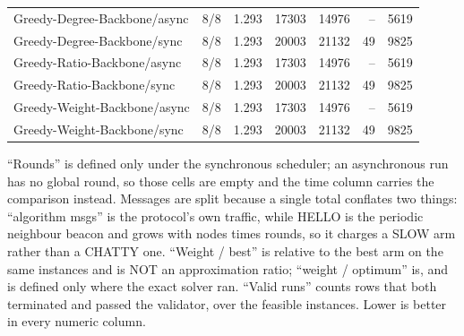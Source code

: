 \begin{table}[tb]
\begin{tabular}{lrrrrrr}
Greedy-Degree-Backbone/async & 8/8 & 1.293 & 17303 & 14976 & -- & 5619 \\
Greedy-Degree-Backbone/sync & 8/8 & 1.293 & 20003 & 21132 & 49 & 9825 \\
Greedy-Ratio-Backbone/async & 8/8 & 1.293 & 17303 & 14976 & -- & 5619 \\
Greedy-Ratio-Backbone/sync & 8/8 & 1.293 & 20003 & 21132 & 49 & 9825 \\
Greedy-Weight-Backbone/async & 8/8 & 1.293 & 17303 & 14976 & -- & 5619 \\
Greedy-Weight-Backbone/sync & 8/8 & 1.293 & 20003 & 21132 & 49 & 9825 \\
\bottomrule
\end{tabular}
\begin{flushleft}\footnotesize
``Rounds'' is defined only under the synchronous scheduler; an asynchronous run has no global round, so those cells are empty and the time column carries the comparison instead. Messages are split because a single total conflates two things: ``algorithm msgs'' is the protocol's own traffic, while HELLO is the periodic neighbour beacon and grows with nodes times rounds, so it charges a SLOW arm rather than a CHATTY one. ``Weight / best'' is relative to the best arm on the same instances and is NOT an approximation ratio; ``weight / optimum'' is, and is defined only where the exact solver ran. ``Valid runs'' counts rows that both terminated and passed the validator, over the feasible instances. Lower is better in every numeric column.
\end{flushleft}
\end{table}

